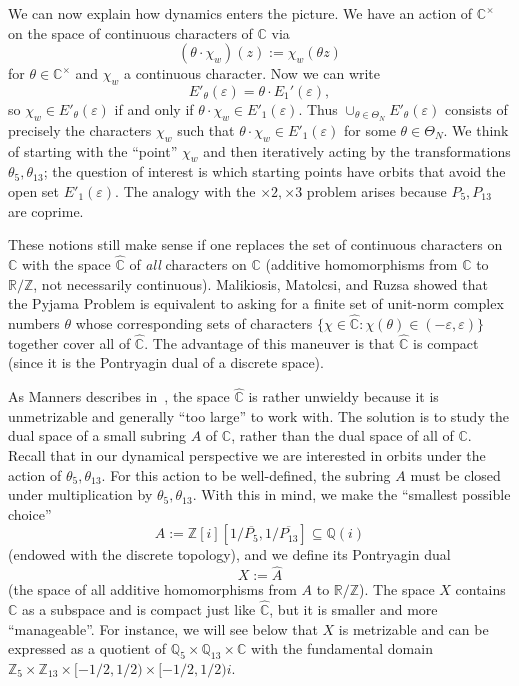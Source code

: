 \documentclass[11pt]{amsart}
\theoremstyle{definition}
\newcommand{\C}{{\mathbb C}}
\begin{document}
We can now explain how dynamics enters the picture.  We have an action of $\mathbb{C}^\times$ on the space of continuous characters of $\mathbb{C}$ via
$$(\theta \cdot \chi_w)(z):=\chi_w(\theta z)$$
for $\theta \in \mathbb{C}^\times$ and $\chi_w$ a continuous character.  Now we can write
$$E'_\theta(\varepsilon)=\theta \cdot E_1'(\varepsilon),$$
so $\chi_w \in E'_\theta(\varepsilon)$ if and only if $\theta \cdot \chi_w \in E'_1(\varepsilon)$.  Thus $\cup_{\theta \in \Theta_N} E'_\theta(\varepsilon)$ consists of precisely the characters $\chi_w$ such that $\theta \cdot \chi_w \in E'_1(\varepsilon)$ for some $\theta \in \Theta_N$.  We think of starting with the ``point'' $\chi_w$ and then iteratively acting by the transformations $\theta_5, \theta_{13}$; the question of interest is which starting points have orbits that avoid the open set $E'_1(\varepsilon)$.  The analogy with the $\times 2, \times 3$ problem arises because $P_5, P_{13}$ are coprime.



These notions still make sense if one replaces the set of continuous characters on $\mathbb{C}$ with the space $\widehat{\mathbb{C}}$ of \emph{all} characters on $\mathbb{C}$ (additive homomorphisms from $\mathbb{C}$ to $\mathbb{R}/\mathbb{Z}$, not necessarily continuous).  Malikiosis, Matolcsi, and Ruzsa showed that the Pyjama Problem is equivalent to asking for a finite set of unit-norm complex numbers $\theta$ whose corresponding sets of characters
$\{\chi \in \widehat{\mathbb{C}}: \chi(\theta) \in (-\varepsilon, \varepsilon)\}$
together cover all of $\widehat{\mathbb{C}}$.  The advantage of this maneuver is that $\widehat{\mathbb{C}}$ is compact (since it is the Pontryagin dual of a discrete space).

As Manners describes in~\cite[Section 5.2]{Man13}, the space $\widehat{\mathbb{C}}$ is rather unwieldy because it is unmetrizable and generally ``too large'' to work with.  The solution is to study the dual space of a small subring $A$ of $\mathbb{C}$, rather than the dual space of all of $\mathbb{C}$.  Recall that in our dynamical perspective we are interested in orbits under the action of $\theta_5, \theta_{13}$.  For this action to be well-defined, the subring $A$ must be closed under multiplication by $\theta_5, \theta_{13}$.  With this in mind, we make the ``smallest possible choice''
$$A:=\mathbb{Z}[i][1/\overline{P_5}, 1/\overline{P_{13}}] \subseteq \mathbb{Q}(i)$$
(endowed with the discrete topology), and we define its Pontryagin dual
$$X:=\widehat{A}$$
(the space of all additive homomorphisms from $A$ to $\mathbb{R}/\mathbb{Z}$).  The space $X$ contains $\mathbb{C}$ as a subspace and is compact just like $\widehat{\mathbb{C}}$, but it is smaller and more ``manageable''.  For instance, we will see below that $X$ is metrizable and can be expressed as a quotient of $\mathbb{Q}_5 \times \mathbb{Q}_{13} \times \C$ with the fundamental domain $\mathbb{Z}_5 \times \mathbb{Z}_{13} \times [-1/2,1/2) \times [-1/2,1/2)i$.
\end{document}
